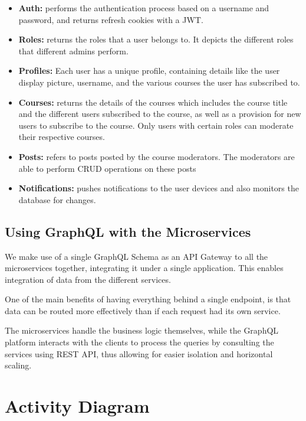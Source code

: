 \begin{itemize}
    \item \textbf{Auth:} performs the authentication process based on a username and password, and returns refresh cookies with a JWT.
    \item \textbf{Roles:}  returns the roles that a user belongs to. It depicts the different roles that different admins perform.
    \item \textbf{Profiles:} Each user has a unique profile, containing details like the user display picture, username, and the various courses the user has subscribed to.
    \item \textbf{Courses:}  returns the details of the courses which includes the course title and the different users subscribed to the course, as well as a provision for new users to subscribe to the course. Only users with certain roles can moderate their respective courses.
    \item \textbf{Posts:} refers to posts posted by the course moderators. The moderators are able to perform CRUD operations on these posts
    \item \textbf{Notifications:}  pushes notifications to the user devices and also monitors the database for changes.
\end{itemize}

\subsection{Using GraphQL with the Microservices}

We make  use of a single GraphQL Schema as an API Gateway to all the microservices together, 
integrating it under a single application. This enables integration of data from the different services.

One of the main benefits of having everything behind a single endpoint, is that data can be routed more 
effectively than if each request had its own service. 

The microservices handle the business logic themselves, while the GraphQL platform interacts with the 
clients to process the queries by consulting the services using REST API, thus allowing for easier isolation 
and horizontal scaling.



\section{Activity Diagram}

